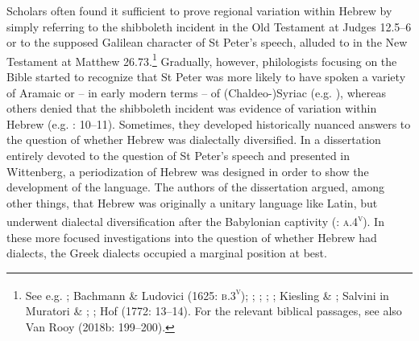 Scholars often found it sufficient to prove regional variation within Hebrew by simply referring to the shibboleth incident in the Old Testament at Judges 12.5–6 or to the supposed Galilean character of St Peter’s speech, alluded to in the New Testament at Matthew 26.73.\footnote{See e.g. \citet[6]{Bovelles1533}; Bachmann \& Ludovici (1625: \textsc{b.3}\textsc{\textsuperscript{v}}); \citet[102]{Weemes1632}; \citet[2]{Wyss1650}; \citet[18]{Walton1657}; \citet[180]{Webb1669}; Kiesling \& \citet[6]{Bause1712}; Salvini in Muratori \& \citet[103]{Salvini1724}; \citet[30]{Hauptmann1751}; Hof (1772: 13–14). For the relevant biblical passages, see also Van Rooy (2018b: 199–200).} Gradually, however, philologists focusing on the Bible started to recognize that St Peter was more likely to have spoken a variety of Aramaic or – in early modern terms – of (Chaldeo-)Syriac (e.g. \citealt{PfeifferMartini1663}), whereas others denied that the shibboleth incident was evidence of variation within Hebrew (e.g. \citealt{Mayer1629}: 10–11). Sometimes, they developed historically nuanced answers to the question of whether Hebrew was dialectally diversified. In a dissertation entirely devoted to the question of St Peter’s speech and presented in Wittenberg, a periodization of Hebrew was designed in order to show the development of the language. The authors of the dissertation argued, among other things, that Hebrew was originally a unitary language like Latin, but underwent dialectal diversification after the Babylonian captivity (\citealt{PfeifferMartini1663}: \textsc{a.4}\textsc{\textsuperscript{v}}). In these more focused investigations into the question of whether Hebrew had dialects, the Greek dialects occupied a marginal position at best.

